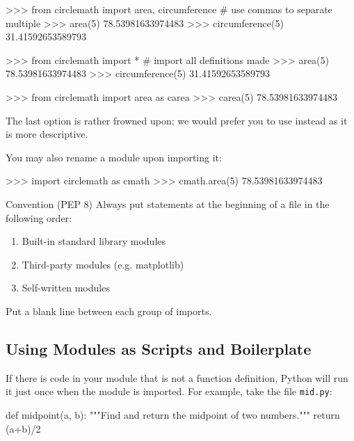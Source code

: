 \documentclass[11pt]{cselabheader}
\begin{document}
{\begin{pyconcode}
>>> from circlemath import area, circumference # use commas to separate multiple
>>> area(5)
78.53981633974483
>>> circumference(5)
31.41592653589793
\end{pyconcode}

\begin{pyconcode}
>>> from circlemath import * # import all definitions made
>>> area(5)
78.53981633974483
>>> circumference(5)
31.41592653589793
\end{pyconcode}

\begin{pyconcode}
>>> from circlemath import area as carea
>>> carea(5)
78.53981633974483
\end{pyconcode}

The last option is rather frowned upon; we would prefer you to use
 instead as it is more descriptive.

You may also rename a module upon importing it:

\begin{pyconcode}
>>> import circlemath as cmath
>>> cmath.area(5)
78.53981633974483
\end{pyconcode}


\begin{infobox}{Convention (PEP 8)}
  Always put  statements at the beginning of a file in the
  following order:
  \begin{enumerate}
    \item Built-in standard library modules
    \item Third-party modules (e.g. matplotlib)
    \item Self-written modules
  \end{enumerate}
  Put a blank line between each group of imports.
\end{infobox}

\subsection{Using Modules as Scripts and Boilerplate}

If there is code in your module that is not a function definition, Python will
run it just once when the module is imported. For example, take the file
\texttt{mid.py}:

\begin{python3code}
def midpoint(a, b):
    """Find and return the midpoint of two numbers."""
    return (a+b)/2


\end{python3code}}
\end{document}
